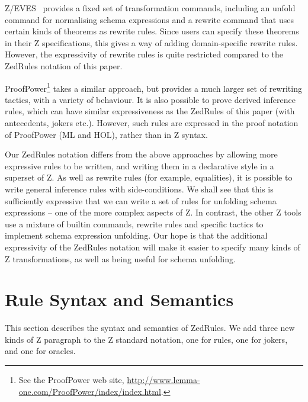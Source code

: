 \documentclass{entcs}
\begin{document}
Z/EVES~\cite{zeves:98} provides a fixed set of transformation
commands, including an unfold command for normalising schema
expressions and a rewrite command that uses certain kinds of theorems
as rewrite rules.  Since users can specify these theorems in their Z
specifications, this gives a way of adding domain-specific rewrite
rules.  However, the expressivity of rewrite rules is quite restricted
compared to the ZedRules notation of this paper.

ProofPower\footnote{See the ProofPower web site,
\url{http://www.lemma-one.com/ProofPower/index/index.html}.} takes a
similar approach, but provides a much larger set of rewriting tactics,
with a variety of behaviour.  It is also possible to prove derived
inference rules, which can have similar expressiveness as the ZedRules
of this paper (with antecedents, jokers etc.).  However, such rules
are expressed in the proof notation of ProofPower (ML and HOL), rather
than in Z syntax.

Our ZedRules notation differs from the above approaches by allowing more
expressive rules to be written, and writing them in a declarative style in
a superset of Z.  As well as rewrite rules (for example, equalities), it is
possible to write general inference rules with side-conditions.  We shall
see that this is sufficiently expressive that we can write a set of rules
for unfolding schema expressions -- one of the more complex aspects of Z.
In contrast, the other Z tools use a mixture of builtin commands, rewrite
rules and specific tactics to implement schema expression unfolding.  Our
hope is that the additional expressivity of the ZedRules notation will make
it easier to specify many kinds of Z transformations, as well as being
useful for schema unfolding.




\section{Rule Syntax and Semantics} \label{sec:syntax}

This section describes the syntax and semantics of ZedRules.
We add three new kinds of Z paragraph to the Z standard notation,
one for rules, one for jokers, and one for oracles.
\end{document}
